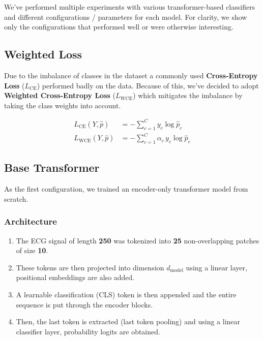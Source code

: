 We've performed multiple experiments with various transformer-based classifiers and different configurations / parameters for each model.
For clarity, we show only the configurations that performed well or were otherwise interesting.

\subsection{Weighted Loss}\label{subsec:04-weighted-loss}

Due to the imbalance of classes in the dataset a commonly used \textbf{Cross-Entropy Loss} ($L_{\mathrm{CE}}$) performed badly on the data.
Because of this, we've decided to adopt \textbf{Weighted Cross-Entropy Loss} ($L_{\mathrm{WCE}}$) which mitigates the imbalance by taking the class weights into account.

\begin{align}
    L_{\mathrm{CE}}(Y, \hat{p}) &= - \sum_{c=1}^{C} y_c \log \hat{p}_c \label{eq:04-cross-entropy} \\
    L_{\mathrm{WCE}}(Y, \hat{p}) &= - \sum_{c=1}^{C} \alpha_c \, y_c \log \hat{p}_c \label{eq:04-weighted-cross-entropy}
\end{align}

\subsection{Base Transformer}\label{subsec:04-base-transformer}

As the first configuration, we trained an encoder-only transformer model from scratch.

\subsubsection{Architecture}

\begin{enumerate}
    \item The ECG signal of length \textbf{250} was tokenized into \textbf{25} non-overlapping patches of size \textbf{10}.
    \item These tokens are then projected into dimension $d_{\mathrm{model}}$ using a linear layer, positional embeddings are also added.
    \item A learnable classification (CLS) token is then appended and the entire sequence is put through the encoder blocks.
    \item Then, the last token is extracted (last token pooling) and using a linear classifier layer, probability logits are obtained.
\end{enumerate}

